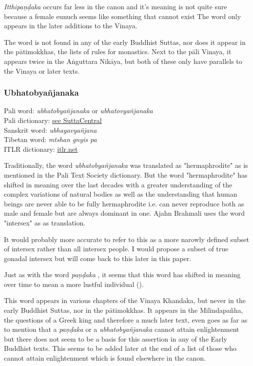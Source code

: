 {\em Itthipaṇḍaka } occurs far less in the canon and it's meaning is not quite sure because a female eunuch seems like something that cannot exist The word only appears in the later additions to the Vinaya.

The word is not found in any of the early Buddhist Suttas, nor does it appear in the pātimokkhas, the lists of rules for monastics. Next to the pāli Vinaya, it appears twice in the Aṅguttara Nikāya, but both of these only have parallels to the Vinaya or later texts.


\subsubsection{Ubhatob­yañ­janaka}

Pali word: {\em ubhatob­yañ­janaka} or {\em ubhatovyañ­janaka} \\
Pali dictionary: \href{https://suttacentral.net/define/ubhatovya%C3%B1janaka}{see SuttaCentral} \\
Sanskrit word: {\em ubhayavyañjana} \\
Tibetan word: {\em mtshan gnyis pa} \\
ITLR dictionary: \href{http://www.itlr.net/hwid:62844}{itlr.net} \\

\medskip

Traditionally, the word {\em ubhatob­yañ­janaka } was translated as "hermaphrodite" as is mentioned in the Pali Text Society dictionary. But the word "hermaphrodite" has shifted in meaning over the last decades with a greater understanding of the complex variations of natural bodies as well as the understanding that human beings are never able to be fully hermaphrodite i.e. can never reproduce both as male and female but are always dominant in one. Ajahn Brahmali uses the word "intersex" as as translation.

It would probably more accurate to refer to this as a more narowly defined subset of intersex rather than all intersex people. I would propose a subset of true gonadal intersex but will come back to this later in this paper.

Just as with the word {\em paṇḍaka }, it seems that this word has shifted in meaning over time to mean a more lustful individual (\cite{vimala}).

This word appears in various chapters of the Vinaya Khandaka, but never in the early Buddhist Suttas, nor in the pātimokkhas. It appears in the Milindapañha, the questions of a Greek king and therefore a much later text, even goes as far as to mention that a {\em paṇḍaka } or a {\em ubhatob­yañ­janaka } cannot attain enlightenment but there does not seem to be a basis for this assertion in any of the Early Buddhist texts. This seems to be added later at the end of a list of those who cannot attain enlightenment which is found elsewhere in the canon.


